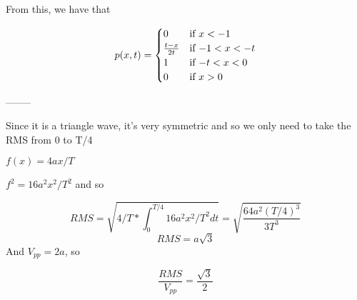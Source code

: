 \documentclass{article}
\begin{document}
From this, we have that

\begin{equation*}
p(x, t) = 
\begin{cases}
0 & \text{if $x < -1$}\\
\frac{t - x }{2t} & \text{if $-1 < x < -t$}\\
1 & \text{if $ -t < x < 0$}\\
0 & \text{if $x > 0$} 
\end{cases}
\end{equation*}

--------



\vspace{2cm}

Since it is a triangle wave, it's very symmetric and so we only need to take the RMS from 0 to T/4

$f(x) = 4ax/T$ 

 $f^2 = 16a^2x^2/T^2$ and so 

$$RMS = \sqrt{4/T * \int^{T/4}_0 16a^2x^2/T^2 dt} = \sqrt{\frac{64a^2(T/4)^3}{3T^3}}$$ 
$$RMS = a \sqrt{3}$$
And $V_{pp} = 2a$, so 

$$\frac{RMS}{V_{pp}} = \frac{\sqrt{3}}{2}$$
\end{document}
